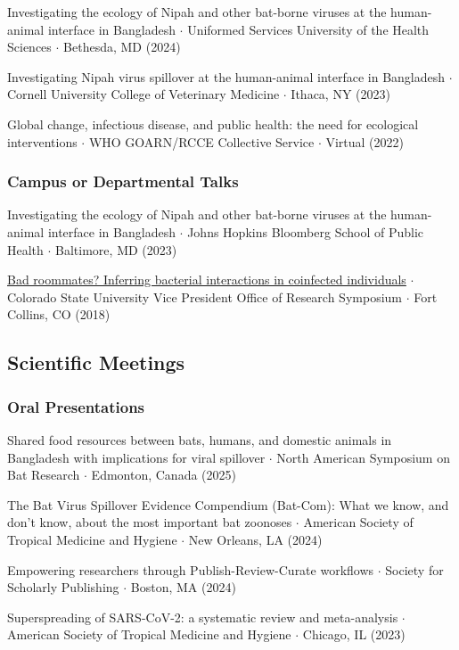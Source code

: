\documentclass{cv}
\begin{document}
Investigating the ecology of Nipah and other bat-borne viruses at the human-animal interface in Bangladesh $\cdot$ Uniformed Services University of the Health Sciences $\cdot$ Bethesda, MD (2024)

Investigating Nipah virus spillover at the human-animal interface in Bangladesh $\cdot$ Cornell University College of Veterinary Medicine $\cdot$ Ithaca, NY (2023)

Global change, infectious disease, and public health: the need for ecological interventions $\cdot$ WHO GOARN/RCCE Collective Service $\cdot$ Virtual (2022)

\subsubsection*{Campus or Departmental Talks}

Investigating the ecology of Nipah and other bat-borne viruses at the human-animal interface in Bangladesh $\cdot$ Johns Hopkins Bloomberg School of Public Health $\cdot$ Baltimore, MD (2023)

\href{https://www.youtube.com/watch?v=lYWR_dZRdjE}{Bad roommates? Inferring bacterial interactions in coinfected individuals} $\cdot$ Colorado State University Vice President Office of Research Symposium $\cdot$ Fort Collins, CO (2018)

\subsection*{Scientific Meetings}

\subsubsection*{Oral Presentations}

Shared food resources between bats, humans, and domestic animals in Bangladesh with implications for viral spillover $\cdot$ North American Symposium on Bat Research $\cdot$ Edmonton, Canada (2025)

The Bat Virus Spillover Evidence Compendium (Bat-Com): What we know, and don’t know, about the most important bat zoonoses $\cdot$ American Society of Tropical Medicine and Hygiene $\cdot$ New Orleans, LA (2024)

Empowering researchers through Publish-Review-Curate workflows $\cdot$ Society for Scholarly Publishing $\cdot$ Boston, MA (2024)

Superspreading of SARS-CoV-2: a systematic review and meta-analysis $\cdot$ American Society of Tropical Medicine and Hygiene $\cdot$ Chicago, IL (2023)
\end{document}
